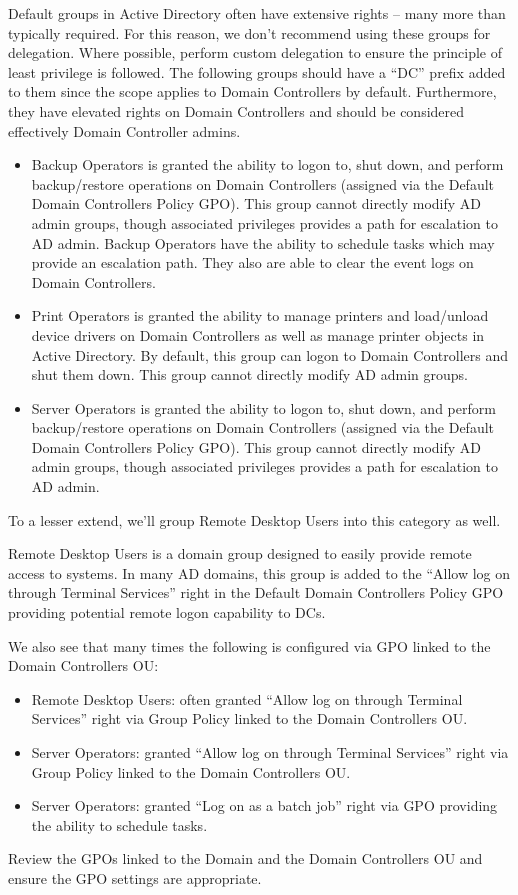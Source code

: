 Default groups in Active Directory often have extensive rights – many more than typically required. For this reason, we don’t recommend using these groups for delegation. Where possible, perform custom delegation to ensure the principle of least privilege is followed. The following groups should have a “DC” prefix added to them since the scope applies to Domain Controllers by default. Furthermore, they have elevated rights on Domain Controllers and should be considered effectively Domain Controller admins.

\begin{itemize}
    \item Backup Operators is granted the ability to logon to, shut down, and perform backup/restore operations on Domain Controllers (assigned via the Default Domain Controllers Policy GPO). This group cannot directly modify AD admin groups, though associated privileges provides a path for escalation to AD admin. Backup Operators have the ability to schedule tasks which may provide an escalation path. They also are able to clear the event logs on Domain Controllers.
    \item Print Operators is granted the ability to manage printers and load/unload device drivers on Domain Controllers as well as manage printer objects in Active Directory. By default, this group can logon to Domain Controllers and shut them down. This group cannot directly modify AD admin groups.
    \item Server Operators is granted the ability to logon to, shut down, and perform backup/restore operations on Domain Controllers (assigned via the Default Domain Controllers Policy GPO). This group cannot directly modify AD admin groups, though associated privileges provides a path for escalation to AD admin.
\end{itemize}
To a lesser extend, we’ll group Remote Desktop Users into this category as well.

Remote Desktop Users is a domain group designed to easily provide remote access to systems. In many AD domains, this group is added to the “Allow log on through Terminal Services” right in the Default Domain Controllers Policy GPO providing potential remote logon capability to DCs.

We also see that many times the following is configured via GPO linked to the Domain Controllers OU:

\begin{itemize}
    \item Remote Desktop Users: often granted “Allow log on through Terminal Services” right via Group Policy linked to the Domain Controllers OU.
    \item Server Operators: granted “Allow log on through Terminal Services” right via Group Policy linked to the Domain Controllers OU.
    \item Server Operators: granted “Log on as a batch job” right via GPO providing the ability to schedule tasks.
\end{itemize}
Review the GPOs linked to the Domain and the Domain Controllers OU and ensure the GPO settings are appropriate.

